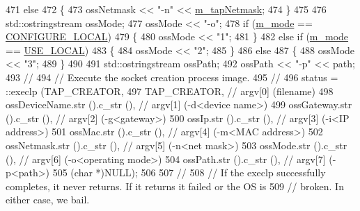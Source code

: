 \begin{DoxyCode}
471       \textcolor{keywordflow}{else}
472         \{
473           ossNetmask << \textcolor{stringliteral}{"-n"} << \hyperlink{classns3_1_1TapBridge_a9374f832e2a96385651d27a5fbc7ba57}{m\_tapNetmask};
474         \}
475 
476       std::ostringstream ossMode;
477       ossMode << \textcolor{stringliteral}{"-o"};
478       \textcolor{keywordflow}{if} (\hyperlink{classns3_1_1TapBridge_aaae30bc9d5dd36e3a4d569cf9bcf40eb}{m\_mode} == \hyperlink{classns3_1_1TapBridge_acac8d3ebe259ddfa9cd369515f04618daf2d0f6c8152d38e9400b2d9fd35f02a3}{CONFIGURE\_LOCAL})
479         \{
480           ossMode << \textcolor{stringliteral}{"1"};
481         \}
482       \textcolor{keywordflow}{else} \textcolor{keywordflow}{if} (\hyperlink{classns3_1_1TapBridge_aaae30bc9d5dd36e3a4d569cf9bcf40eb}{m\_mode} == \hyperlink{classns3_1_1TapBridge_acac8d3ebe259ddfa9cd369515f04618daa73ff9ba9e1659aeda35d7181b601c75}{USE\_LOCAL})
483         \{
484           ossMode << \textcolor{stringliteral}{"2"};
485         \}
486       \textcolor{keywordflow}{else}
487         \{
488           ossMode << \textcolor{stringliteral}{"3"};
489         \}
490 
491       std::ostringstream ossPath;
492       ossPath << \textcolor{stringliteral}{"-p"} << path;
493       \textcolor{comment}{//}
494       \textcolor{comment}{// Execute the socket creation process image.}
495       \textcolor{comment}{//}
496       status = ::execlp (TAP\_CREATOR, 
497                          TAP\_CREATOR,                       \textcolor{comment}{// argv[0] (filename)}
498                          ossDeviceName.str ().c\_str (),       \textcolor{comment}{// argv[1] (-d<device name>)}
499                          ossGateway.str ().c\_str (),          \textcolor{comment}{// argv[2] (-g<gateway>)}
500                          ossIp.str ().c\_str (),               \textcolor{comment}{// argv[3] (-i<IP address>)}
501                          ossMac.str ().c\_str (),              \textcolor{comment}{// argv[4] (-m<MAC address>)}
502                          ossNetmask.str ().c\_str (),          \textcolor{comment}{// argv[5] (-n<net mask>)}
503                          ossMode.str ().c\_str (),             \textcolor{comment}{// argv[6] (-o<operating mode>)}
504                          ossPath.str ().c\_str (),             \textcolor{comment}{// argv[7] (-p<path>)}
505                          (\textcolor{keywordtype}{char} *)NULL);
506 
507       \textcolor{comment}{//}
508       \textcolor{comment}{// If the execlp successfully completes, it never returns.  If it returns it failed or the OS is}
509       \textcolor{comment}{// broken.  In either case, we bail.}

\end{DoxyCode}
